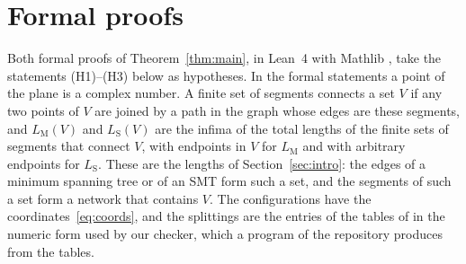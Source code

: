 \documentclass[11pt]{amsart}
\theoremstyle{definition}
\theoremstyle{remark}
\numberwithin{equation}{section}
\newcommand{\LS}{L_{\mathrm S}}
\newcommand{\LM}{L_{\mathrm M}}
\begin{document}
\section{Formal proofs}\label{sec:lean}

Both formal proofs of Theorem~\ref{thm:main}, in Lean~4 \cite{Lean4} with Mathlib \cite{Mathlib}, take the statements (H1)--(H3) below as hypotheses. In the formal statements a point of the plane is a complex number. A finite set of segments connects a set $V$ if any two points of $V$ are joined by a path in the graph whose edges are these segments, and $\LM(V)$ and $\LS(V)$ are the infima of the total lengths of the finite sets of segments that connect $V$, with endpoints in $V$ for $\LM$ and with arbitrary endpoints for $\LS$. These are the lengths of Section~\ref{sec:intro}: the edges of a minimum spanning tree or of an SMT form such a set, and the segments of such a set form a network that contains $V$. The configurations have the coordinates~\eqref{eq:coords}, and the splittings are the entries of the tables of \cite{KHSHGW} in the numeric form used by our checker, which a program of the repository produces from the tables.
\end{document}
